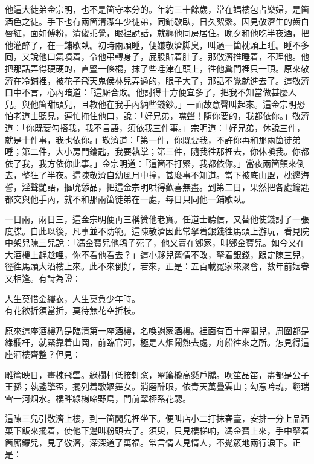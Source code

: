 他這大徒弟金宗明，也不是箇守本分的。年約三十餘歲，常在娼樓包占樂婦，是箇酒色之徒。手下也有兩箇清潔年少徒弟，同鋪歇臥，日久絮繁。{}因見敬濟生的齒白唇紅，面如傅粉，清俊乖覺，眼裡說話，就纏他同房居住。晚夕和他吃半夜酒，把他灌醉了，在一鋪歇臥。初時兩頭睡，便嫌敬濟脚臭，叫過一箇枕頭上睡。睡不多囘，又說他口氣噴着，令他弔轉身子，屁股貼着肚子。那敬濟推睡着，不理他。他把那話弄得硬硬的，直豎一條棍，抹了些唾津在頭上，徃他糞門裡只一頂。原來敬濟在冷鋪裡，被花子飛天鬼侯林兒弄過的，眼子大了，那話不覺就進去了。{}這敬濟口中不言，心內暗道：「這厮合敗。他討得十方便宜多了，把我不知當做甚麼人兒。與他箇甜頭兒，且教他在我手內納些錢鈔。」一面故意聲叫起來。這金宗明恐怕老道士聽見，連忙掩住他口，說：「好兄弟，噤聲！隨你要的，我都依你。」敬濟道：「你既要勾搭我，我不言語，須依我三件事。」{}宗明道：「好兄弟，休說三件，就是十件事，我也依你。」敬濟道：「第一件，你既要我，不許你再和那兩箇徒弟睡；第二件，大小房門鑰匙，我要執掌；第三件，隨我徃那裡去，你休嗔我。你都依了我，我方依你此事。」金宗明道：「這箇不打緊，我都依你。」當夜兩箇顛來倒去，整狂了半夜。這陳敬濟自幼風月中撞，甚麼事不知道。當下被底山盟，枕邊海誓，淫聲艷語，摳吮舔品，{}把這金宗明哄得歡喜無盡。到第二日，果然把各處鑰匙都交與他手內，就不和那兩箇徒弟在一處，每日只同他一鋪歇臥。

一日兩，兩日三，這金宗明便再三稱赞他老實。任道士聽信，又替他使錢討了一張度牒。自此以後，凡事並不防範。這陳敬濟因此常拏着銀錢徃馬頭上游玩，看見院中架兒陳三兒說：「馮金寶兒他鴇子死了，他又賣在鄭家，叫鄭金寶兒。如今又在大酒樓上趕趁哩，你不看他看去？」這小夥兒舊情不改，拏着銀錢，跟定陳三兒，徑徃馬頭大酒樓上來。此不來倒好，若來，正是：五百載冤家來聚會，數年前姻眷又相逢。有詩為證：

\begin{myquote}
人生莫惜金縷衣，人生莫負少年時。\\有花欲折須當折，莫待無花空折枝。
\end{myquote}

原來這座酒樓乃是臨清第一座酒樓，名喚謝家酒樓。裡面有百十座閣兒，周圍都是綠欄杆，就緊靠着山岡，前臨官河，極是人烟鬧熱去處，舟船徃來之所。怎見得這座酒樓齊整？但見：

\begin{myquote}
雕簷映日，畫棟飛雲。綠欄杆低接軒窓，翠簾櫳高懸戶牖。吹笙品笛，盡都是公子王孫；執盞擎盃，擺列着歌嫗舞女。消磨醉眼，依青天萬疊雲山；勾惹吟魂，翻瑞雪一河烟水。樓畔綠楊啼野鳥，門前翠桺系花驄。
\end{myquote}

這陳三兒引敬濟上樓，到一箇閣兒裡坐下。便叫店小二打抹春臺，安排一分上品酒菓下飯來擺着，使他下邊叫粉頭去了。須臾，只見樓梯响，馮金寶上來，手中拏着箇厮鑼兒，見了敬濟，深深道了萬福。常言情人見情人，不覺簇地兩行淚下。{}正是：


